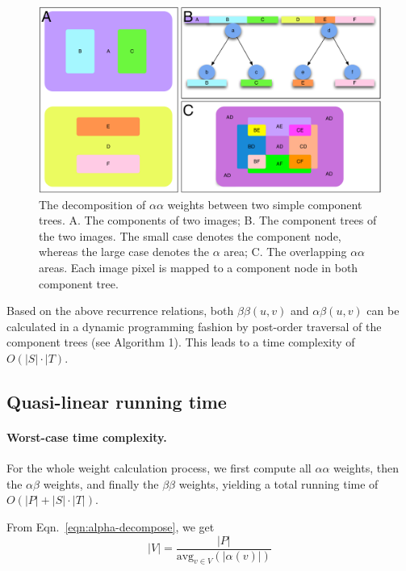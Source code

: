 \begin{figure}[htbp]
\centering
\includegraphics[width=1.0\textwidth]{images/cptree_aaweight}
\caption[The decomposition of $\alpha\alpha$ weights between two simple component
trees.]{The decomposition of $\alpha\alpha$ weights between two simple component
trees. A. The components of two images; B. The component trees of the two images. 
The small case denotes the component node, whereas the large case denotes the $\alpha$
area; C. The overlapping $\alpha\alpha$ areas. Each image pixel is mapped to a 
component node in both component tree.}
\label{fig:cptree-aaweight}
\end{figure}

Based on the above recurrence relations, both $\beta\beta(u,v)$ and
$\alpha\beta(u,v)$ can be calculated in a dynamic programming fashion by
post-order traversal of the component trees (see Algorithm 1). This leads to a
time complexity of $O(|S| \cdot |T)$.  

\subsection{Quasi-linear running time}
\paragraph{Worst-case time complexity.} For the whole weight calculation
process, we first compute all $\alpha\alpha$ weights, then the
$\alpha\beta$ weights, and finally the $\beta\beta$ weights, yielding
a total running time of $O(|P| + |S|\cdot|T|)$.  

\def\avg{\mathrm{avg}}

From Eqn.~\eqref{eqn:alpha-decompose}, we get
\begin{equation*}
|V| = \frac{|P|}{\avg_{v\in V}(|\alpha(v)|)} 
\end{equation*}

